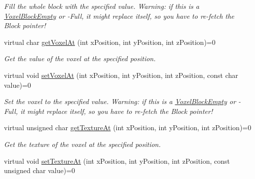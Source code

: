\begin{DoxyCompactItemize}
\begin{DoxyCompactList}\small\item\em \-Fill the whole block with the specified value. \-Warning\-: if this is a \hyperlink{classVoxelBlockEmpty}{\-Voxel\-Block\-Empty} or -\/\-Full, it might replace itself, so you have to re-\/fetch the \-Block pointer! \end{DoxyCompactList}\item 
\hypertarget{classVoxelBlock_a18c2ddea93a81e8d5131c149931827ce}{
virtual char \hyperlink{classVoxelBlock_a18c2ddea93a81e8d5131c149931827ce}{get\-Voxel\-At} (int x\-Position, int y\-Position, int z\-Position)=0}
\label{d1/d83/classVoxelBlock_a18c2ddea93a81e8d5131c149931827ce}

\begin{DoxyCompactList}\small\item\em \-Get the value of the voxel at the specified position. \end{DoxyCompactList}\item 
\hypertarget{classVoxelBlock_a18e059b06bb536d110442bd891de39ca}{
virtual void \hyperlink{classVoxelBlock_a18e059b06bb536d110442bd891de39ca}{set\-Voxel\-At} (int x\-Position, int y\-Position, int z\-Position, const char value)=0}
\label{d1/d83/classVoxelBlock_a18e059b06bb536d110442bd891de39ca}

\begin{DoxyCompactList}\small\item\em \-Set the voxel to the specified value. \-Warning\-: if this is a \hyperlink{classVoxelBlockEmpty}{\-Voxel\-Block\-Empty} or -\/\-Full, it might replace itself, so you have to re-\/fetch the \-Block pointer! \end{DoxyCompactList}\item 
\hypertarget{classVoxelBlock_aac965848d3028cd98224174c069df077}{
virtual unsigned char \hyperlink{classVoxelBlock_aac965848d3028cd98224174c069df077}{get\-Texture\-At} (int x\-Position, int y\-Position, int z\-Position)=0}
\label{d1/d83/classVoxelBlock_aac965848d3028cd98224174c069df077}

\begin{DoxyCompactList}\small\item\em \-Get the texture of the voxel at the specified position. \end{DoxyCompactList}\item 
\hypertarget{classVoxelBlock_a82d0023f704e116ca95a82cfd19901ce}{
virtual void \hyperlink{classVoxelBlock_a82d0023f704e116ca95a82cfd19901ce}{set\-Texture\-At} (int x\-Position, int y\-Position, int z\-Position, const unsigned char value)=0}
\label{d1/d83/classVoxelBlock_a82d0023f704e116ca95a82cfd19901ce}


\end{DoxyCompactItemize}
